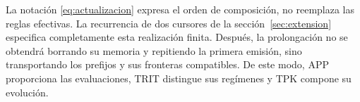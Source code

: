 La notación \eqref{eq:actualizacion} expresa el orden de composición, no
reemplaza las reglas efectivas. La recurrencia de dos cursores de la
sección~\ref{sec:extension} especifica completamente esta realización finita.
Después, la prolongación no se obtendrá borrando su memoria y repitiendo la
primera emisión, sino transportando los prefijos y sus fronteras compatibles.
De este modo, APP proporciona las evaluaciones, TRIT distingue sus regímenes
y TPK compone su evolución.





